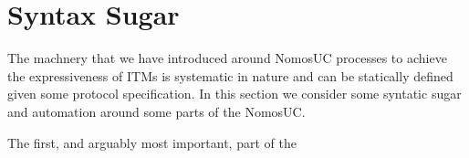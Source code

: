 


\section{Syntax Sugar}
The machnery that we have introduced around NomosUC processes to achieve the expressiveness of ITMs is systematic in nature and can be statically defined given some protocol specification.
In this section we consider some syntatic sugar and automation around some parts of the NomosUC.

The first, and arguably most important, part of the 
